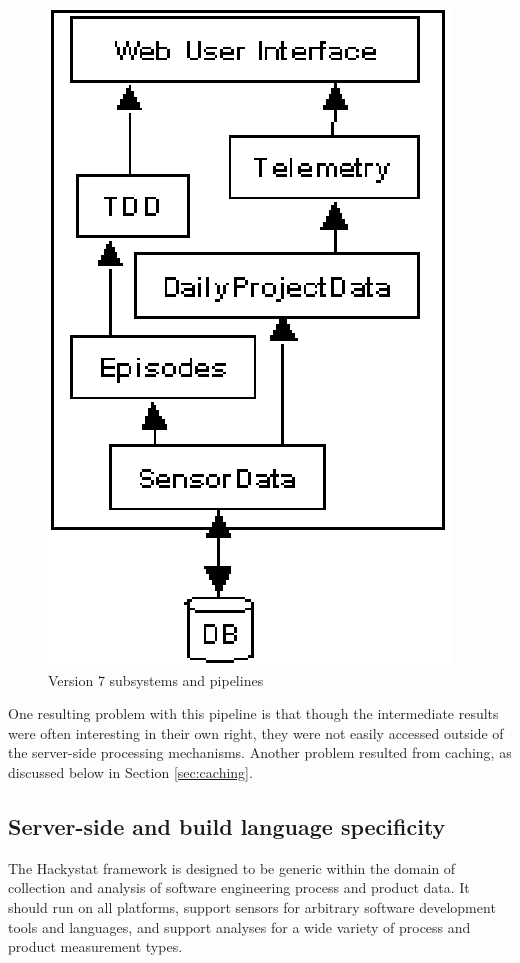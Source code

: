 \documentclass[conference,compsoc]{IEEEtran}
\begin{document}
\begin{figure}[ht]
  \center
  \includegraphics{subsystems.eps}
  \caption{Version 7 subsystems and pipelines}
  \label{fig:subsystems}
\end{figure} 

One resulting problem with this pipeline is that though the intermediate
results were often interesting in their own right, they were not easily
accessed outside of the server-side processing mechanisms. Another problem 
resulted from caching, as discussed below in Section \ref{sec:caching}.

\subsection{Server-side and build language specificity}

The Hackystat framework is designed to be generic within the domain of
collection and analysis of software engineering process and product data.
It should run on all platforms, support sensors for arbitrary software
development tools and languages, and support analyses for a wide variety of
process and product measurement types.
\end{document}
